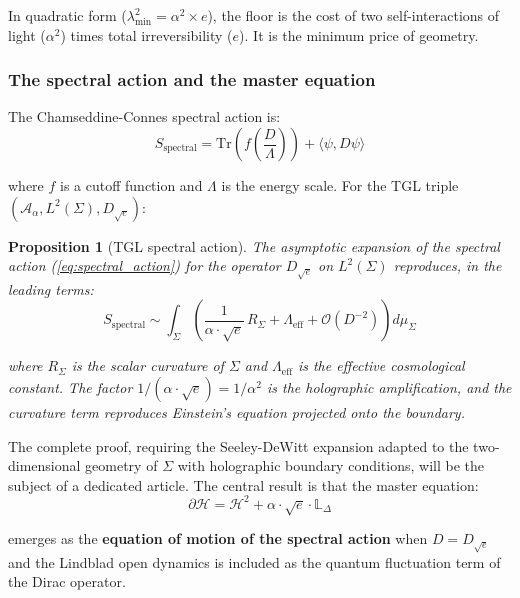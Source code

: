 \documentclass[12pt,a4paper,twoside]{article}
\newtheorem{proposition}[theorem]{Proposition}
\newcommand{\alphaii}{\alpha^{2}}
\newcommand{\boundary}{\textit{boundary}}
\begin{document}
In quadratic form ($\lambda_{\min}^2 = \alpha^2 \times e$), the floor is the cost of two self-interactions of light ($\alpha^2$) times total irreversibility ($e$). It is the minimum price of geometry.

\subsubsection{The spectral action and the master equation}

The Chamseddine-Connes spectral action \cite{Chamseddine1997} is:
\begin{equation}
S_{\text{spectral}} = \text{Tr}\!\left(f\!\left(\frac{D}{\Lambda}\right)\right) + \langle \psi, D\psi \rangle
\label{eq:spectral_action}
\end{equation}

\noindent where $f$ is a cutoff function and $\Lambda$ is the energy scale. For the TGL triple $(\mathcal{A}_\alpha, L^2(\Sigma), D_{\sqrt{e}})$:

\begin{proposition}[TGL spectral action]
\label{prop:acao_espectral}
The asymptotic expansion of the spectral action (\ref{eq:spectral_action}) for the operator $D_{\sqrt{e}}$ on $L^2(\Sigma)$ reproduces, in the leading terms:
\begin{equation}
S_{\text{spectral}} \sim \int_\Sigma \left(\frac{1}{\alpha \cdot \sqrt{e}}\, R_\Sigma + \Lambda_{\text{eff}} + \mathcal{O}(D^{-2})\right) d\mu_\Sigma
\end{equation}

\noindent where $R_\Sigma$ is the scalar curvature of $\Sigma$ and $\Lambda_{\text{eff}}$ is the effective cosmological constant. The factor $1/(\alpha \cdot \sqrt{e}) = 1/\alphaii$ is the holographic amplification, and the curvature term reproduces Einstein's equation projected onto the \boundary{}.
\end{proposition}

The complete proof, requiring the Seeley-DeWitt expansion adapted to the two-dimensional geometry of $\Sigma$ with holographic boundary conditions, will be the subject of a dedicated article. The central result is that the master equation:
\begin{equation}
\partial\mathcal{H} = \mathcal{H}^2 + \alpha \cdot \sqrt{e} \cdot \mathbb{L}_\Delta
\end{equation}

\noindent emerges as the \textbf{equation of motion of the spectral action} when $D = D_{\sqrt{e}}$ and the Lindblad open dynamics is included as the quantum fluctuation term of the Dirac operator.
\end{document}

